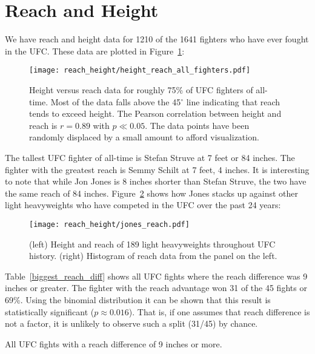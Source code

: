 \clearpage
\section{Reach and Height}

We have reach and height data for 1210 of the 1641 fighters who have ever fought in the
UFC. These data are plotted in Figure~\ref{height_reach_all_fighters}:

\begin{figure}[h]
\begin{center}
\texttt{[image: reach\_height/height\_reach\_all\_fighters.pdf]}
\caption{Height versus reach data for roughly 75\% of UFC fighters
of all-time.
Most of the data falls above the 45$^{\circ}$ line indicating that
reach tends to exceed height. The Pearson correlation between height
and reach is $r=0.89$ with $p\ll 0.05$. The data points have been randomly displaced
by a small amount to afford visualization.}
\label{height_reach_all_fighters}
\end{center}
\end{figure}

The tallest UFC fighter of all-time is Stefan Struve at 7 feet or 84 inches. The fighter
with the greatest reach is Semmy Schilt at 7 feet, 4 inches. It is interesting
to note that while Jon Jones is 8 inches shorter than
Stefan Struve, the two have the same reach of 84 inches. Figure~\ref{jones_reach} shows
how Jones stacks up against other light heavyweights who have competed in the UFC
over the past 24 years:

\begin{figure}[h]
\begin{center}
\texttt{[image: reach\_height/jones\_reach.pdf]}
\caption{(left) Height and reach of 189 light heavyweights throughout
UFC history.
(right) Histogram of reach data from the panel on the left.}
\label{jones_reach}
\end{center}
\end{figure}

Table~\ref{biggest_reach_diff} shows all UFC fights where the reach difference
was 9 inches or greater. The fighter with the
reach advantage won 31 of the 45 fights or 69\%. Using the
binomial distribution it can be shown that this result is
statistically significant ($p\approx0.016$). That is, if one
assumes that reach difference is not a factor, it is unlikely to observe
such a split (31/45) by chance.

\begin{center}
\begin{table}[h]

\caption{All UFC fights with a reach difference of 9 inches or more.}
\label{biggest_reach_diff}
\end{table}
\end{center}

